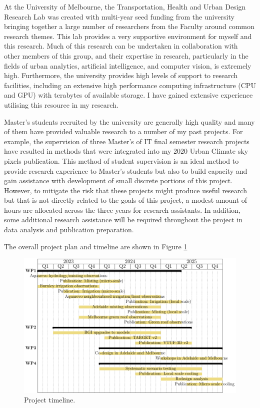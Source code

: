 At the University of Melbourne, the Transportation, Health and Urban Design Research Lab was created with multi-year seed funding from the university bringing together a large number of researchers from the Faculty around common research themes. This lab provides a very supportive environment for myself and this research. Much of this research can be undertaken in collaboration with other members of this group, and their expertise in research, particularly in the fields of urban analytics, artificial intelligence, and computer vision, is extremely high. Furthermore, the university provides high levels of support to research facilities, including an extensive high performance computing infrastructure (CPU and GPU) with terabytes of available storage. I have gained extensive experience utilising this resource in my research. 

Master's students recruited by the university are generally high quality and many of them have provided valuable research to a number of my past projects. For example, the supervision of three Master's of IT final semester research projects have resulted in methods that were integrated into my 2020 Urban Climate sky pixels publication\cite{Nice2020}. This method of student supervision is an ideal method to provide research experience to Master's students but also to build capacity and gain assistance with development of small discrete portions of this project. However, to mitigate the risk that these projects might produce useful research but that is not directly related to the goals of this project, a modest amount of hours are allocated across the three years for research assistants. In addition, some additional research assistance will be required throughout the project in data analysis and publication preparation.

The overall project plan and timeline are shown in Figure \ref{fig:timeline}

\begin{figure}[ht]
\centering
\includegraphics[scale=0.70]{DECRA-D-timeline.pdf}
\caption{Project timeline. }
\label{fig:timeline}
\end{figure}



